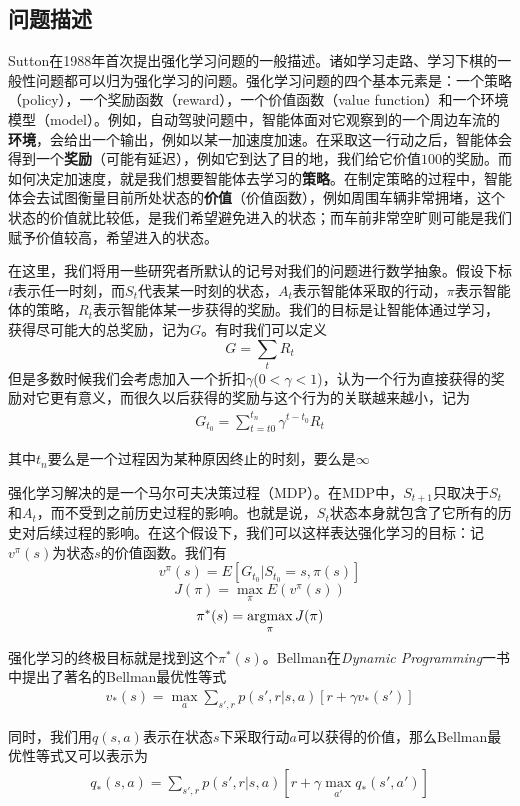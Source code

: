   \subsection{问题描述}
    Sutton在1988年首次提出强化学习问题的一般描述\cite{Sutton_problem_formulation}。诸如学习走路、学习下棋的一般性问题都可以归为强化学习的问题。强化学习问题的四个基本元素是：一个策略（policy），一个奖励函数（reward），一个价值函数（value function）和一个环境模型（model）。例如，自动驾驶问题中，智能体面对它观察到的一个周边车流的\textbf{环境}，会给出一个输出，例如以某一加速度加速。在采取这一行动之后，智能体会得到一个\textbf{奖励}（可能有延迟），例如它到达了目的地，我们给它价值$100$的奖励。而如何决定加速度，就是我们想要智能体去学习的\textbf{策略}。在制定策略的过程中，智能体会去试图衡量目前所处状态的\textbf{价值}（价值函数），例如周围车辆非常拥堵，这个状态的价值就比较低，是我们希望避免进入的状态；而车前非常空旷则可能是我们赋予价值较高，希望进入的状态。\par
    在这里，我们将用一些研究者所默认的记号对我们的问题进行数学抽象。假设下标$t$表示任一时刻，而$S_t$代表某一时刻的状态，$A_t$表示智能体采取的行动，$\pi$表示智能体的策略，$R_t$表示智能体某一步获得的奖励。我们的目标是让智能体通过学习，获得尽可能大的总奖励，记为$G$。有时我们可以定义
      $$ G = \sum_{t} R_t $$
    但是多数时候我们会考虑加入一个折扣$\gamma$($0 < \gamma < 1$)，认为一个行为直接获得的奖励对它更有意义，而很久以后获得的奖励与这个行为的关联越来越小，记为
      \begin{align}
        G_{t_0} = \sum_{t = t0}^{t_n} \gamma^{t-t_0} R_t
        \label{eq:G}
      \end{align}
    \par 其中$t_n$要么是一个过程因为某种原因终止的时刻，要么是$\infty$
    \par
    强化学习解决的是一个马尔可夫决策过程（MDP）\cite{Bellman_MDP}。在MDP中，$S_{t+1}$只取决于$S_t$和$A_t$，而不受到之前历史过程的影响。也就是说，$S_t$状态本身就包含了它所有的历史对后续过程的影响。在这个假设下，我们可以这样表达强化学习的目标\cite{DRL_for_driving}：记$v^{\pi}(s)$为状态$s$的价值函数。我们有$$ v^{\pi}(s) = E[G_{t_0} | S_{t_0} = s, \pi(s) ] $$
      $$ J(\pi) = \max_{\pi} E(v^{\pi}(s)) $$
      $$ \pi^*(s) = \operatorname*{argmax}_{\pi} J(\pi) $$
    \par 强化学习的终极目标就是找到这个$\pi^*(s)$。Bellman在\textit{Dynamic Programming}一书中提出了著名的Bellman最优性等式\cite{Bellman_DP}
    \begin{align}
       v_*(s) = \max_{a} \sum_{s', r}p(s', r | s, a)[r + \gamma v_*(s')]
    \end{align}
    \par 同时，我们用$q(s, a)$表示在状态$s$下采取行动$a$可以获得的价值，那么Bellman最优性等式又可以表示为
    \begin{align}
       q_*(s, a) = \sum_{s', r}p(s', r | s, a)[r + \gamma \max_{a'} q_*(s', a')]
    \end{align}

